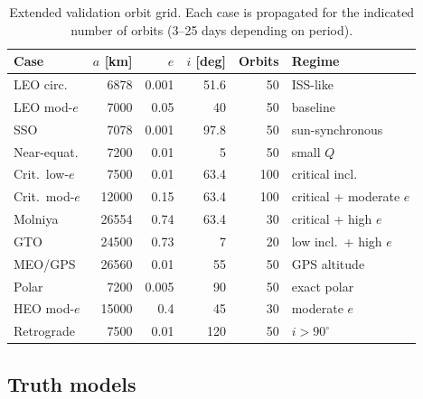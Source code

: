 \documentclass[11pt]{article}
\begin{document}
\begin{table}[ht]
\centering
\caption{Extended validation orbit grid. Each case is propagated for the
indicated number of orbits (3--25 days depending on period).}
\label{tab:ext_orbits}
\small
\begin{tabular}{@{}lrrrrl@{}}
\toprule
Case & $a$ [km] & $e$ & $i$ [deg] & Orbits & Regime \\
\midrule
LEO circ.       & 6878  & 0.001 & 51.6   & 50  & ISS-like \\
LEO mod-$e$     & 7000  & 0.05  & 40     & 50  & baseline \\
SSO             & 7078  & 0.001 & 97.8   & 50  & sun-synchronous \\
Near-equat.     & 7200  & 0.01  & 5      & 50  & small $Q$ \\
Crit.\ low-$e$  & 7500  & 0.01  & 63.4   & 100 & critical incl.\ \\
Crit.\ mod-$e$  & 12000 & 0.15  & 63.4   & 100 & critical + moderate $e$ \\
Molniya         & 26554 & 0.74  & 63.4   & 30  & critical + high $e$ \\
GTO             & 24500 & 0.73  & 7      & 20  & low incl.\ + high $e$ \\
MEO/GPS         & 26560 & 0.01  & 55     & 50  & GPS altitude \\
Polar           & 7200  & 0.005 & 90     & 50  & exact polar \\
HEO mod-$e$     & 15000 & 0.4   & 45     & 30  & moderate $e$ \\
Retrograde      & 7500  & 0.01  & 120    & 50  & $i > 90^\circ$ \\
\bottomrule
\end{tabular}
\end{table}

\subsection{Truth models}
\end{document}
